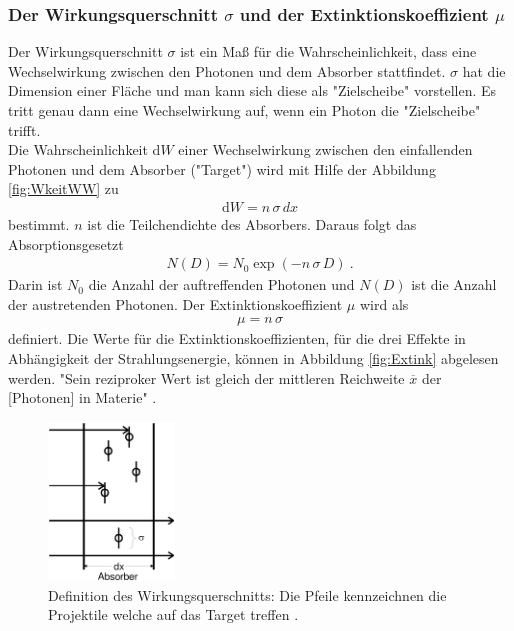 \subsubsection{Der Wirkungsquerschnitt \texorpdfstring{$\sigma$}{} und der Extinktionskoeffizient \texorpdfstring{$\mu$}{}}
Der Wirkungsquerschnitt $\sigma$ ist ein Maß für die Wahrscheinlichkeit, dass eine Wechselwirkung zwischen den Photonen und dem Absorber stattfindet. $\sigma$ hat die Dimension einer Fläche und man kann sich diese als "Zielscheibe" vorstellen. Es tritt genau dann eine Wechselwirkung auf, wenn ein Photon die "Zielscheibe" trifft. \\
Die Wahrscheinlichkeit d$W$ einer Wechselwirkung zwischen den einfallenden Photonen und dem Absorber ("Target") wird mit Hilfe der Abbildung \eqref{fig:WkeitWW} zu
\begin{align}
	\text{d}W = n\,\sigma\,dx
\end{align}
bestimmt. $n$ ist die Teilchendichte des Absorbers.
Daraus folgt das Absorptionsgesetzt
\begin{align}
	N(D) = N_0 \exp(-n\,\sigma\,D) \ .
	\label{eqn:absorption}
\end{align}
Darin ist $N_0$ die Anzahl der auftreffenden Photonen und $N(D)$ ist die Anzahl der austretenden Photonen. Der Extinktionskoeffizient $\mu$ wird als
\begin{align}
	\mu = n\,\sigma
\end{align}
definiert. Die Werte für die Extinktionskoeffizienten, für die drei Effekte in Abhängigkeit der Strahlungsenergie, können in Abbildung \eqref{fig:Extink} abgelesen werden. "Sein reziproker Wert ist gleich der mittleren Reichweite $\overline{x}$ der [Photonen] in Materie" \cite[2]{V18}.

\begin{figure}
	\centering
	\includegraphics[width=0.3\textwidth]{Bilder/WkeitWW.png}
	\caption{Definition des Wirkungsquerschnitts: Die Pfeile kennzeichnen die Projektile welche auf das Target treffen \cite{V18}.}
	\label{fig:WkeitWW}
\end{figure}

